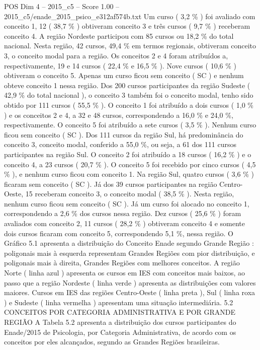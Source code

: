\begin{textsample}{POS Dim 4 – 2015\_c5 – Score 1.00 – 2015\_c5/enade\_2015\_psico\_e312af574b.txt}
Um curso ( 3,2 \% ) foi avaliado com conceito 1, 12 ( 38,7 \% ) obtiveram conceito 3 e três cursos ( 9,7 \% ) receberam conceito 4.
A região Nordeste participou com 85 cursos ou 18,2 \% do total nacional.
Nesta região, 42 cursos, 49,4 \% em termos regionais, obtiveram conceito 3, o conceito modal para a região.
Os conceitos 2 e 4 foram atribuídos a, respectivamente, 19 e 14 cursos ( 22,4 \% e 16,5 \% ).
Nove cursos ( 10,6 \% ) obtiveram o conceito 5.
Apenas um curso ficou sem conceito ( SC ) e nenhum obteve conceito 1 nessa região.
Dos 200 cursos participantes da região Sudeste ( 42,9 \% do total nacional ), o conceito 3 também foi o conceito modal, tenho sido obtido por 111 cursos ( 55,5 \% ).
O conceito 1 foi atribuído a dois cursos ( 1,0 \% ) e os conceitos 2 e 4, a 32 e 48 cursos, correspondendo a 16,0 \% e 24,0 \%, respectivamente.
O conceito 5 foi atribuído a sete cursos ( 3,5 \% ).
Nenhum curso ficou sem conceito ( SC ).
Dos 111 cursos da região Sul, há predominância do conceito 3, conceito modal, conferido a 55,0 \%, ou seja, a 61 dos 111 cursos participantes na região Sul.
O conceito 2 foi atribuído a 18 cursos ( 16,2 \% ) e o conceito 4, a 23 cursos ( 20,7 \% ).
O conceito 5 foi recebido por cinco cursos ( 4,5 \% ), e nenhum curso ficou com conceito 1.
Na região Sul, quatro cursos ( 3,6 \% ) ficaram sem conceito ( SC ).
Já dos 39 cursos participantes na região Centro-Oeste, 15 receberam conceito 3, o conceito modal ( 38,5 \% ).
Nesta região, nenhum curso ficou sem conceito ( SC ).
Já um curso foi alocado no conceito 1, correspondendo a 2,6 \% dos cursos nessa região.
Dez cursos ( 25,6 \% ) foram avaliados com conceito 2, 11 cursos ( 28,2 \% ) obtiveram conceito 4 e somente dois cursos ficaram com conceito 5, correspondendo 5,1 \%, nessa região.
O Gráfico 5.1 apresenta a distribuição do Conceito Enade segundo Grande Região : poligonais mais à esquerda representam Grandes Regiões com pior distribuição, e poligonais mais à direita, Grandes Regiões com melhores conceitos.
A região Norte ( linha azul ) apresenta os cursos em IES com conceitos mais baixos, ao passo que a região Nordeste ( linha verde ) apresenta as distribuições com valores maiores.
Cursos em IES das regiões Centro-Oeste ( linha preta ), Sul ( linha roxa ) e Sudeste ( linha vermelha ) apresentam uma situação intermediária. 5.2 CONCEITOS POR CATEGORIA ADMINISTRATIVA E POR GRANDE REGIÃO A Tabela 5.2 apresenta a distribuição dos cursos participantes do Enade/2015 de Psicologia, por Categoria Administrativa, de acordo com os conceitos por eles alcançados, segundo as Grandes Regiões brasileiras.

\end{textsample}
